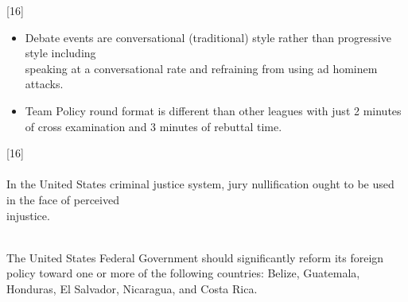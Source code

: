 \documentclass[11pt]{memoir}    %
\def\subregspacing{16pt}
\def\regspacing{19pt}
\begin{document}
\label{subsec:DebateEventChanges}
\noindent{}[16]

\begin{itemize}
    \item Debate events are conversational (traditional) style rather than progressive style including \\speaking at a conversational rate and refraining from using ad hominem attacks.
    \item Team Policy round format is different than other leagues with just 2 minutes of cross examination and 3 minutes of rebuttal time.
\end{itemize}\vspace{\regspacing}

\label{subsec:24-25Resolutions}
\noindent{}[16]\vspace{\regspacing}\\
\textcolor{HeaderGrey}{}\vspace{\subregspacing}\\
{In the United States criminal justice system, jury nullification ought to be used in the face of perceived \\injustice.}\vspace{\regspacing}

\noindent\textcolor{HeaderGrey}{}\vspace{\subregspacing}\\
{The United States Federal Government should significantly reform its foreign policy toward one or more of the following countries: Belize, Guatemala, Honduras, El Salvador, Nicaragua, and Costa Rica.}

\newpage

\label{sec:toc}


\makeatletter
    \renewcommand{\cftdotsep}{0.1}
    \renewcommand{\tableofcontents}{
        \section*{\fontspec{Times New Roman}\fontsize{20pt}{23pt}\selectfont\textbf{Table of Contents}}
    \@starttoc{toc}
}
\makeatother
\end{document}
